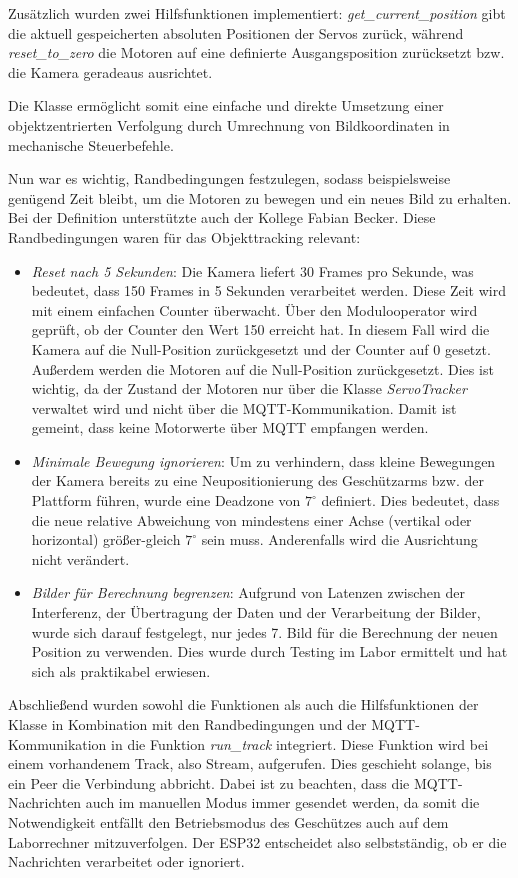 Zusätzlich wurden zwei Hilfsfunktionen implementiert: \textit{get\_current\_position} gibt die aktuell gespeicherten absoluten Positionen der Servos zurück, während \textit{reset\_to\_zero} die Motoren auf eine definierte Ausgangsposition zurücksetzt bzw. die Kamera geradeaus ausrichtet. \newline

Die Klasse ermöglicht somit eine einfache und direkte Umsetzung einer objektzentrierten Verfolgung durch Umrechnung von Bildkoordinaten in mechanische Steuerbefehle. \newline

Nun war es wichtig, Randbedingungen festzulegen, sodass beispielsweise genügend Zeit bleibt, um die Motoren zu bewegen und ein neues Bild zu erhalten. Bei der Definition unterstützte auch der Kollege Fabian Becker. Diese Randbedingungen waren für das Objekttracking relevant:

\begin{itemize}
    \item \textit{Reset nach 5 Sekunden}: Die Kamera liefert 30 Frames pro Sekunde, was bedeutet, dass 150 Frames in 5 Sekunden verarbeitet werden. Diese Zeit wird mit einem einfachen Counter überwacht. Über den Modulooperator wird geprüft, ob der Counter den Wert 150 erreicht hat. In diesem Fall wird die Kamera auf die Null-Position zurückgesetzt und der Counter auf 0 gesetzt. Außerdem werden die Motoren auf die Null-Position zurückgesetzt. Dies ist wichtig, da der Zustand der Motoren nur über die Klasse \textit{ServoTracker} verwaltet wird und nicht über die MQTT-Kommunikation. Damit ist gemeint, dass keine Motorwerte über MQTT empfangen werden.
    
    \item \textit{Minimale Bewegung ignorieren}: Um zu verhindern, dass kleine Bewegungen der Kamera bereits zu eine Neupositionierung des Geschützarms bzw. der Plattform führen, wurde eine Deadzone von $7^\circ$ definiert. Dies bedeutet, dass die neue relative Abweichung von mindestens einer Achse (vertikal oder horizontal) größer-gleich $7^\circ$ sein muss. Anderenfalls wird die Ausrichtung nicht verändert.
    
    \item \textit{Bilder für Berechnung begrenzen}: Aufgrund von Latenzen zwischen der Interferenz, der Übertragung der Daten und der Verarbeitung der Bilder, wurde sich darauf festgelegt, nur jedes 7. Bild für die Berechnung der neuen Position zu verwenden. Dies wurde durch Testing im Labor ermittelt und hat sich als praktikabel erwiesen.
\end{itemize}

Abschließend wurden sowohl die Funktionen als auch die Hilfsfunktionen der Klasse in Kombination mit den Randbedingungen und der MQTT-Kommunikation in die Funktion \textit{run\_track} integriert. Diese Funktion wird bei einem vorhandenem Track, also Stream, aufgerufen. Dies geschieht solange, bis ein Peer die Verbindung abbricht. Dabei ist zu beachten, dass die MQTT-Nachrichten auch im manuellen Modus immer gesendet werden, da somit die Notwendigkeit entfällt den Betriebsmodus des Geschützes auch auf dem Laborrechner mitzuverfolgen. Der ESP32 entscheidet also selbstständig, ob er die Nachrichten verarbeitet oder ignoriert. 